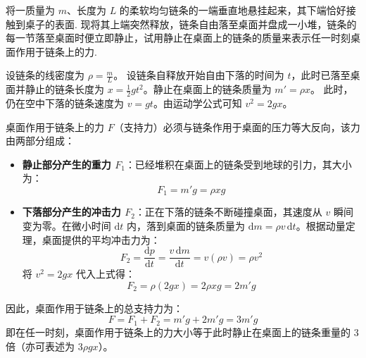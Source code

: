 \begin{exercise}\label{ex:5.3}
将一质量为 $m$、长度为 $L$ 的柔软均匀链条的一端垂直地悬挂起来，其下端恰好接触到桌子的表面. 现将其上端突然释放，链条自由落至桌面并盘成一小堆，链条的每一节落至桌面时便立即静止，试用静止在桌面上的链条的质量来表示任一时刻桌面作用于链条上的力.
\end{exercise}
\begin{solution}
设链条的线密度为 $\rho = \frac{m}{L}$。
设链条自释放开始自由下落的时间为 $t$，此时已落至桌面并静止的链条长度为 $x = \frac{1}{2}gt^2$。静止在桌面上的链条质量为 $m' = \rho x$。
此时，仍在空中下落的链条速度为 $v = gt$。由运动学公式可知 $v^2 = 2gx$。

桌面作用于链条上的力 $F$（支持力）必须与链条作用于桌面的压力等大反向，该力由两部分组成：
\begin{itemize}
    \item \textbf{静止部分产生的重力 $F_1$}：已经堆积在桌面上的链条受到地球的引力，其大小为：
    $$ F_1 = m' g = \rho x g $$
    
    \item \textbf{下落部分产生的冲击力 $F_2$}：正在下落的链条不断碰撞桌面，其速度从 $v$ 瞬间变为零。在微小时间 $\mathrm{d}t$ 内，落到桌面的链条质量为 $\mathrm{d}m = \rho v \, \mathrm{d}t$。根据动量定理，桌面提供的平均冲击力为：
    $$ F_2 = \frac{\mathrm{d}p}{\mathrm{d}t} = \frac{v \, \mathrm{d}m}{\mathrm{d}t} = v (\rho v) = \rho v^2 $$
    将 $v^2 = 2gx$ 代入上式得：
    $$ F_2 = \rho (2gx) = 2 \rho x g = 2m' g $$
\end{itemize}

因此，桌面作用于链条上的总支持力为：
$$ F = F_1 + F_2 = m' g + 2m' g = 3m' g $$
即在任一时刻，桌面作用于链条上的力大小等于此时静止在桌面上的链条重量的 $3$ 倍（亦可表述为 $3\rho g x$）。
\end{solution}

